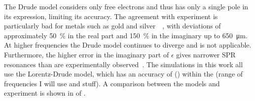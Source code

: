 The Drude model considers only free electrons and thus has only a single
pole in its expression, limiting its accuracy.  The agreement with
experiment is particularly bad for metals such as gold and
silver~\cite{ahmedcomputational}~\cite{jahanshahi2014study}, with
deviations of approximately \SI{50}{\percent} in the real part and
\SI{150}{\percent} in the imaginary up to \SI{650}{\micro\meter}.  At
higher frequencies the Drude model continues to diverge and is not
applicable.  Furthermore, the higher error in the imaginary part of
$\epsilon$ gives narrower SPR resonances than are experimentally
observed~\cite{jahanshahi2014study}.  The simulations in this work all use
the Lorentz-Drude model, which has an accuracy of () within the (range of
frequencies I will use and stuff).  A comparison between the models and
experiment is shown in  of
.
